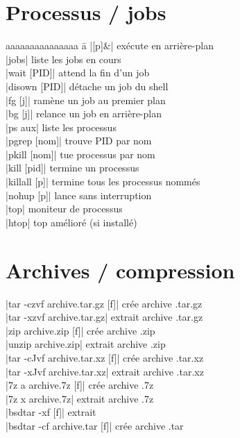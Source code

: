 \documentclass{article}
\newenvironment{cmdblock}{%
  \par\setlength{\parindent}{0pt}\setlength{\parskip}{0pt}%
  \RaggedRight%
}{\par}
\begin{document}
\begin{multicols}{4}
    \section*{Processus / jobs}
    \begin{tabbing}
        aaaaaaaaaaaaaaa \= a \kill
        \code|[p]&| \> exécute en arrière-plan \\
        \code|jobs| \> liste les jobs en cours \\
        \code|wait [PID]| \> attend la fin d'un job \\
        \code|disown [PID]| \> détache un job du shell \\
        \code|fg [j]| \> ramène un job au premier plan \\
        \code|bg [j]| \> relance un job en arrière-plan \\
        \code|ps aux| \> liste les processus \\
        \code|pgrep [nom]| \> trouve PID par nom \\
        \code|pkill [nom]| \> tue processus par nom \\
        \code|kill [pid]| \> termine un processus \\
        \code|killall [p]| \> termine tous les processus nommés \\
        \code|nohup [p]| \> lance sans interruption \\
        \code|top| \> moniteur de processus \\
        \code|htop| \> top amélioré (si installé)

    \end{tabbing}

    \section*{Archives / compression}
    \begin{cmdblock}
        \code|tar -czvf archive.tar.gz [f]| \quad crée archive .tar.gz \\
        \code|tar -xzvf archive.tar.gz| \quad extrait archive .tar.gz \\
        \code|zip archive.zip [f]| \quad crée archive .zip \\
        \code|unzip archive.zip| \quad extrait archive .zip \\
        \code|tar -cJvf archive.tar.xz [f]| \quad crée archive .tar.xz \\
        \code|tar -xJvf archive.tar.xz| \quad extrait archive .tar.xz \\
        \code|7z a archive.7z [f]| \quad crée archive .7z \\
        \code|7z x archive.7z| \quad extrait archive .7z \\
        \code|bsdtar -xf [f]| \quad extrait \\
        \code|bsdtar -cf archive.tar [f]| \quad crée archive .tar
    \end{cmdblock}


\end{multicols}
\end{document}
